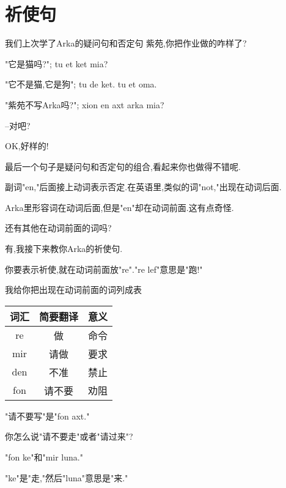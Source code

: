 \chapter[祈使句]{祈使句}

 
我们上次学了Arka的疑问句和否定句
紫苑,你把作业做的咋样了?


"它是猫吗?"; tu et ket mia?

"它不是猫,它是狗"; tu de ket. tu et oma.

"紫苑不写Arka吗?"; xion en axt arka mia?

--对吧?


OK,好样的!

最后一个句子是疑问句和否定句的组合,看起来你也做得不错呢.


副词"en,"后面接上动词表示否定.在英语里,类似的词"not,"出现在动词后面.

Arka里形容词在动词后面,但是"en"却在动词前面.这有点奇怪.

还有其他在动词前面的词吗?


有,我接下来教你Arka的祈使句.

你要表示祈使,就在动词前面放"re"."re lef"意思是"跑!"

我给你把出现在动词前面的词列成表
\begin{table}
    \begin{tabular}{|c|c|c|} %
      \hline
	  \textbf{词汇} & \textbf{简要翻译} & \textbf{意义}\\
      \hline
      re&  做&  命令\\\hline
  mir&  请做&  要求\\\hline
  den&  不准&  禁止\\\hline
  fon&  请不要&  劝阻\\\hline
    \end{tabular}
\end{table}

"请不要写"是"fon axt."

你怎么说"请不要走"或者"请过来"?


"fon ke"和"mir luna."

"ke"是"走,"然后"luna"意思是"来."



